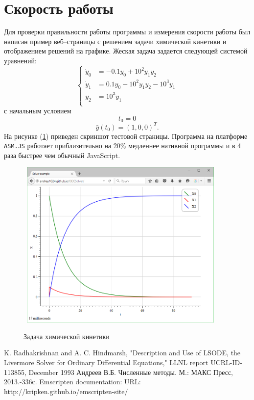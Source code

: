 \documentclass[oneside,final,14pt]{extreport}
\begin{document}
\section{Скорость работы}
Для проверки правильности работы программы и измерения скорости работы был написан пример веб--страницы с решением задачи химической кинетики и отображением решений на графике. Жеская задача задается следующей системой уравнений:
\[
\left\{
\begin{aligned}
	\dot y_0 &= -0.1y_0+10^2y_1y_2\\ 
	\dot y_1 &= 0.1y_0-10^2y_1y_2-10^3y_1\\
	\dot y_2 &= 10^3y_1\\
\end{aligned}
\right.
\]
с начальным условием 
\[
t_0=0
\]
\[
\bar y(t_0)=(1,0,0)^T.
\]
На рисунке (\ref{graph}) приведен скриншот тестовой страницы. Программа на платформе \texttt{ASM.JS} работает приблизительно на 20\% медленнее нативной программы и в 4 раза быстрее чем обычный JavaScript.
\begin{figure}[t]
	\centering
\	\includegraphics[width=0.9\textwidth]{graph}
	\caption{Задача химической кинетики}
	\label{graph}
\end{figure}


\begin{thebibliography}{00}
K. Radhakrishnan and A. C. Hindmarsh, "Description and Use of 
LSODE, the Livermore Solver for Ordinary 
Differential Equations," LLNL report UCRL-ID-113855, December 1993
Андреев В.Б. Численные методы. М.: МАКС Пресс, 2013.-336с.
Emscripten documentation: URL: http://kripken.github.io/emscripten-site/
\end{thebibliography}
\end{document}
